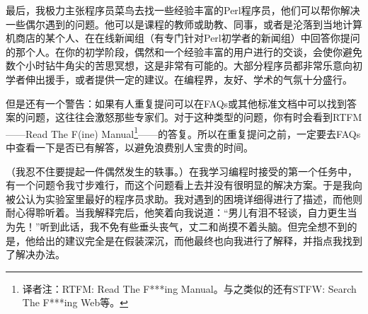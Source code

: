 最后，我极力主张程序员菜鸟去找一些经验丰富的Perl程序员，他们可以帮你解决一些偶尔遇到的问题。他可以是课程的教师或助教、同事，或者是沦落到当地计算机商店的某个人、在在线新闻组（有专门针对Perl初学者的新闻组）中回答你提问的那个人。在你的初学阶段，偶然和一个经验丰富的用户进行的交谈，会使你避免数个小时钻牛角尖的苦思冥想，这是非常有可能的。大部分程序员都非常乐意向初学者伸出援手，或者提供一定的建议。在编程界，友好、学术的气氛十分盛行。

但是还有一个警告：如果有人重复提问可以在FAQs或其他标准文档中可以找到答案的问题，这往往会激怒那些专家们。对于这种类型的问题，你有时会看到RTFM——Read The F(ine) Manual\footnote{译者注：RTFM: Read The F***ing Manual。与之类似的还有STFW: Search The F***ing Web等。}——的答复。所以在重复提问之前，一定要去FAQs中查看一下是否已有解答，以避免浪费别人宝贵的时间。

（我忍不住要提起一件偶然发生的轶事。）在我学习编程时接受的第一个任务中，有一个问题令我寸步难行，而这个问题看上去并没有很明显的解决方案。于是我向被公认为实验室里最好的程序员求助。我对遇到的困境详细得进行了描述，而他则耐心得聆听着。当我解释完后，他笑着向我说道：“男儿有泪不轻谈，自力更生当为先！”听到此话，我不免有些垂头丧气，丈二和尚摸不着头脑。但完全想不到的是，他给出的建议完全是在假装深沉，而他最终也向我进行了解释，并指点我找到了解决办法。
